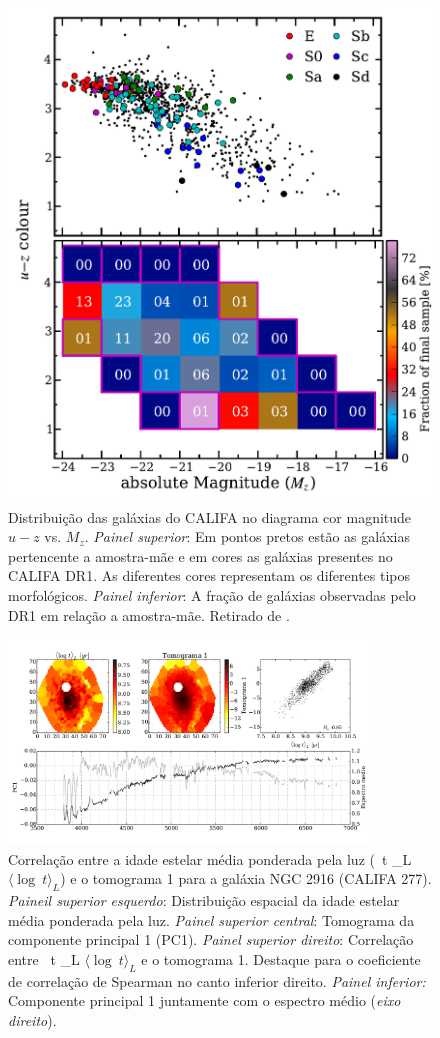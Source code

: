 \documentclass[a4paper,12pt]{article}
\newcommand{\meanL}[1]{\relax\ifmmode \langle #1 \rangle_L \else $\langle #1 \rangle_L$\xspace \fi}
\begin{document}
\begin{figure}
	\begin{center}
    \includegraphics[height=0.5\textwidth]{figuras/figHusemann2013Fig2.pdf}
    \caption[Diagrama cor-magnitude para as galáxias do CALIFA.]
    {Distribui\c{c}\~ao das galáxias do CALIFA no diagrama cor magnitude $u-z$ vs. $M_z$. {\em Painel superior}: Em pontos pretos est\~ao as galáxias
    pertencente a amostra-m\~ae e em cores as galáxias presentes no CALIFA DR1. As diferentes cores representam os diferentes tipos morfológicos.
    {\em Painel inferior}: A fra\c{c}\~ao de galáxias observadas pelo DR1 em rela\c{c}\~ao a amostra-m\~ae. Retirado de \citet{Husemann2013}.}
    \label{fig:cm-uzMz}
    \end{center}
\end{figure}

\begin{figure}
	\begin{center}
    \includegraphics[width=0.85\textwidth]{figuras/K0277-f_obs_norm_pc_1_prop_0.pdf}
    \caption[]{Correla\c{c}\~ao entre a idade estelar média ponderada pela luz (\meanL{\log\ t}) e o tomograma 1 para a galáxia NGC 2916 (CALIFA 277).
    {\em Paineil superior esquerdo}: Distribui\c{c}\~ao espacial da idade estelar média ponderada pela luz. {\em Painel superior central}:
    Tomograma da componente principal 1 (PC1). {\em Painel superior direito}: Correla\c{c}\~ao entre \meanL{\log\ t} e o tomograma 1. Destaque para o
    coeficiente de correla\c{c}\~ao de Spearman no canto inferior direito. {\em Painel inferior:} Componente principal 1 juntamente com o espectro
    médio ({\em eixo direito}).}
    \label{fig:K0277corre}
    \end{center}
\end{figure}
\end{document}
